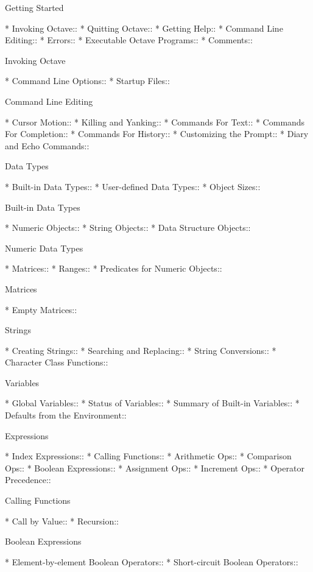 Getting Started

* Invoking Octave::             
* Quitting Octave::             
* Getting Help::                
* Command Line Editing::        
* Errors::                      
* Executable Octave Programs::  
* Comments::                    

Invoking Octave

* Command Line Options::        
* Startup Files::               

Command Line Editing

* Cursor Motion::               
* Killing and Yanking::         
* Commands For Text::           
* Commands For Completion::     
* Commands For History::        
* Customizing the Prompt::      
* Diary and Echo Commands::     

Data Types

* Built-in Data Types::         
* User-defined Data Types::     
* Object Sizes::                

Built-in Data Types

* Numeric Objects::             
* String Objects::              
* Data Structure Objects::      

Numeric Data Types

* Matrices::                    
* Ranges::                      
* Predicates for Numeric Objects::  

Matrices

* Empty Matrices::              

Strings

* Creating Strings::            
* Searching and Replacing::     
* String Conversions::          
* Character Class Functions::   

Variables

* Global Variables::            
* Status of Variables::         
* Summary of Built-in Variables::  
* Defaults from the Environment::  

Expressions

* Index Expressions::           
* Calling Functions::           
* Arithmetic Ops::              
* Comparison Ops::              
* Boolean Expressions::         
* Assignment Ops::              
* Increment Ops::               
* Operator Precedence::         

Calling Functions

* Call by Value::               
* Recursion::                   

Boolean Expressions

* Element-by-element Boolean Operators::  
* Short-circuit Boolean Operators::  

